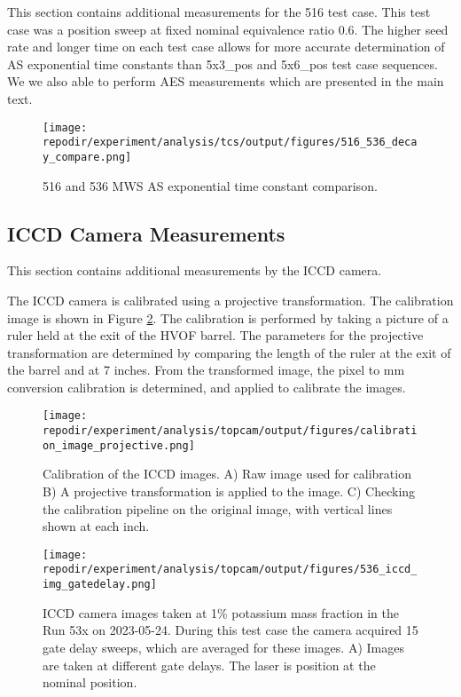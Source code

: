 This section contains additional measurements for the 516 test case. This test case was a position sweep at fixed nominal equivalence ratio 0.6. The higher seed rate and longer time on each test case allows for more accurate determination of AS exponential time constants than 5x3\_pos and 5x6\_pos test case sequences. We we also able to perform AES measurements which are presented in the main text. 


\begin{figure}[]
\centering
\texttt{[image: \\repodir/experiment/analysis/tcs/output/figures/516\_536\_decay\_compare.png]}
\caption{516 and 536 MWS AS exponential time constant comparison.}
\label{fig:SI_516_mws_decaytime}
\end{figure}


\clearpage
\subsection{ICCD Camera Measurements}

This section contains additional measurements by the ICCD camera. 

The ICCD camera is calibrated using a projective transformation. The calibration image is shown in Figure \ref{fig:SI_iccd_calibration}. The calibration is performed by taking a picture of a ruler held at the exit of the HVOF barrel. The parameters for the projective transformation are determined by comparing the length of the ruler at the exit of the barrel and at 7 inches. From the transformed image, the pixel to mm conversion calibration is determined, and applied to calibrate the images. 

\begin{figure}[]
\centering
\texttt{[image: \\repodir/experiment/analysis/topcam/output/figures/calibration\_image\_projective.png]}
\caption{Calibration of the ICCD images. A) Raw image used for calibration B) A projective transformation is applied to the image. C) Checking the calibration pipeline on the original image, with vertical lines shown at each inch.}
\label{fig:SI_iccd_calibration}
\end{figure}

\begin{figure}
    \centering
    \texttt{[image: \\repodir/experiment/analysis/topcam/output/figures/536\_iccd\_img\_gatedelay.png]} 
    \caption{ICCD camera images taken at 1\% potassium mass fraction in the Run 53x on 2023-05-24. During this test case the camera acquired 15 gate delay sweeps, which are averaged for these images. A) Images are taken at different gate delays. The laser is position at the nominal position. }
    \label{fig:SI_536_iccd}
\end{figure}


